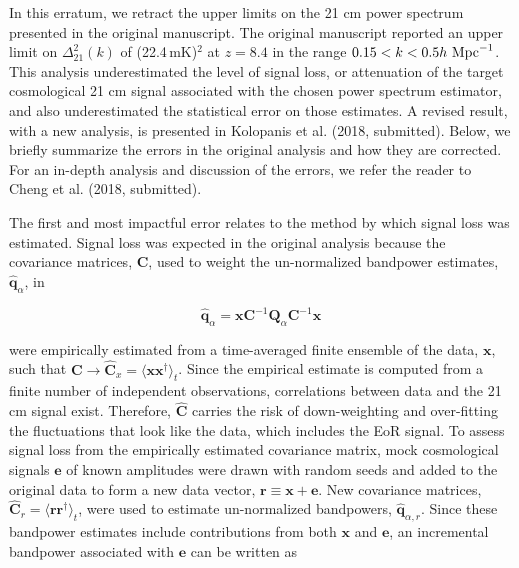 \documentclass[onecolumn]{emulateapj} \shorttitle{}
\newcommand{\hMpci}{h\ {\rm Mpc}^{-1}}
\newcommand{\mKlimit}{(22.4\,\textrm{mK})$^2$ }
\newcommand{\kolopaniscitet}{Kolopanis et al. (2018, submitted)}
\newcommand{\chengcitet}{\textrm{Cheng et al. (2018, submitted)}}
\begin{document}
\maketitle

In this erratum, we retract the upper limits on the 21 cm power spectrum
presented in the original manuscript.  The original manuscript reported an upper
limit on $\Delta_{21}^2(k)$ of \mKlimit at $z=8.4$ in the range
$0.15<k<0.5\hMpci$.  This analysis underestimated the level of signal loss, or attenuation of
the target cosmological 21 cm signal associated with the chosen power spectrum
estimator, and also underestimated the statistical error on those estimates.
A revised result, with a new analysis, is presented in \kolopaniscitet.  Below,
we briefly summarize the errors in the original analysis and how they are
corrected. For an in-depth analysis and discussion of the errors, we refer the reader to
\chengcitet.

The first and most impactful error relates to the method by which signal loss
was estimated. Signal loss was expected in the original analysis because the
covariance matrices, $\textbf{C}$, used to weight the un-normalized bandpower
estimates, ${\widehat{\textbf{q}}}_\alpha$, in

\begin{equation}
{\widehat{\textbf{q}}}_{\alpha} = {\mathbf x}\textbf{C}^{-1}\textbf{Q}_\alpha \textbf{C}^{-1}{\mathbf x}
\end{equation} 

were empirically estimated from a time-averaged finite ensemble of the data,
$\mathbf x$, such that $\mathbf{C}\rightarrow \widehat{\textbf{C}}_{x}=\langle {\mathbf x} {\mathbf x}^\dagger\rangle_{t}$.
Since the empirical estimate is computed from a finite number of independent observations, correlations
between data and the 21 cm signal exist.  Therefore, $\widehat{\textbf{C}}$ carries the risk 
of down-weighting and over-fitting the fluctuations that look like the data, which includes the EoR signal. 
To assess signal loss from the empirically estimated covariance matrix, mock
cosmological signals $\mathbf e$ of known amplitudes were drawn with random
seeds and added to the original data to form a new data vector, 
${\mathbf r}\equiv{\mathbf x} + {\mathbf e}$.
New covariance matrices, 
$\widehat{\textbf{C}}_r=\langle{\mathbf r}\mathbf{r}^\dagger\rangle_{t}$, 
were used to estimate un-normalized bandpowers, 
${\widehat{\textbf{q}}}_{\alpha,r}$. 
Since these bandpower estimates include contributions from both $\mathbf x$ and
$\mathbf e$, an incremental bandpower associated with $\mathbf e$ can be
written as
\end{document}
